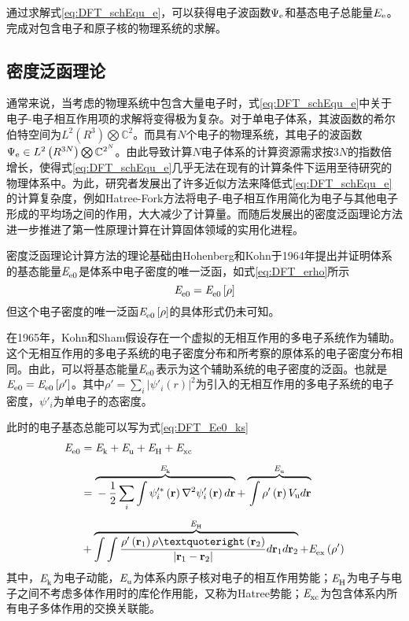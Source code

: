 通过求解式\eqref{eq:DFT_schEqu_e}，可以获得电子波函数$\Psi_{\rm e}$和基态电子总能量$E_{\rm e}$。完成对包含电子和原子核的物理系统的求解。

\subsection{密度泛函理论} 
通常来说，当考虑的物理系统中包含大量电子时，式\eqref{eq:DFT_schEqu_e}中关于电子-电子相互作用项的求解将变得极为复杂。对于单电子体系，其波函数的希尔伯特空间为$L^2\left(R^3\right)\bigotimes \mathbb{C}^2$。而具有$N$个电子的物理系统，其电子的波函数$\Psi_{\rm e}\in L^2\left(R^{3N}\right)\bigotimes \mathbb{C}^{2^N}$。由此导致计算$N$电子体系的计算资源需求按$3N$的指数倍增长，使得式\eqref{eq:DFT_schEqu_e}几乎无法在现有的计算条件下运用至待研究的物理体系中。为此，研究者发展出了许多近似方法来降低式\eqref{eq:DFT_schEqu_e}的计算复杂度，例如Hatree-Fork方法将电子-电子相互作用简化为电子与其他电子形成的平均场之间的作用，大大减少了计算量。而随后发展出的密度泛函理论方法进一步推进了第一性原理计算在计算固体领域的实用化进程。

密度泛函理论计算方法的理论基础由Hohenberg和Kohn于1964年提出并证明\chinesecolon 体系的基态能量$\it E_{\rm e0}^{\rm } \it$是体系中电子密度的唯一泛函，如式\eqref{eq:DFT_erho}所示
\begin{equation}
    \label{eq:DFT_erho}
    \it E_{\rm e0}^{\rm } \it=\it E_{\rm e0}^{\rm } \it\left[\rho\right]
\end{equation}
但这个电子密度的唯一泛函$\it E_{\rm e0}^{\rm } \it\left[\rho\right]$的具体形式仍未可知。

在1965年，Kohn和Sham假设存在一个虚拟的无相互作用的多电子系统作为辅助。这个无相互作用的多电子系统的电子密度分布和所考察的原体系的电子密度分布相同。由此，可以将基态能量$\it E_{\rm e0}^{\rm } \it$表示为这个辅助系统的电子密度的泛函。也就是$\it E_{\rm e0}^{\rm } \it=\it E_{\rm e0}^{\rm } \it\left[\rho'\right]$。其中$\rho'=\sum_i\left\lvert \psi' _i\left(r\right)\right\rvert^2$为引入的无相互作用的多电子系统的电子密度，$\psi'_i$为单电子的态密度。

此时的电子基态总能可以写为式\eqref{eq:DFT_Ee0_ks}\chinesecolon
\begin{equation}
    \label{eq:DFT_Ee0_ks}
    \begin{split}
        \energyVar{e0}{}&=\energyVar{k}{}+\energyVar{u}{}+\energyVar{H}{}+\energyVar{xc}{}\\[+1ex]
        &=\overbrace{\rule[0ex]{0ex}{3.2ex}-\frac{1}{2}\sum_i\int\psi'^*_i\left({\bm r}\right)\nabla^2\psi'_i\left({\bm r}\right)d{\bm r}}^{\energyVar{k}{}} + \overbrace{\rule[0ex]{0ex}{3.2ex}\int\rho'\left({\bm r}\right)V_{\rm u}d{\bm r}}^{\energyVar{u}{}}\\[+1ex]
        &+\overbrace{\int\int \frac{\rho'\left({\bm r}_1\right)\rho’\left({\bm r}_2\right)}{\left\lvert{\bm r}_1 - {\bm r}_2\right\rvert}d{\bm r}_1d{\bm r}_2}^{\energyVar{H}{}}+\energyVar{ex}{}\left(\rho'\right)
    \end{split}
\end{equation}
其中，$\it E_{\rm k}^{\rm } \it$为电子动能，$\it E_{\rm u}^{\rm } \it$为体系内原子核对电子的相互作用势能；$\it E_{\rm H}^{\rm } \it$为电子与电子之间不考虑多体作用时的库伦作用能，又称为Hatree势能；$\it E_{\rm xc}^{\rm } \it$为包含体系内所有电子多体作用的交换关联能。

